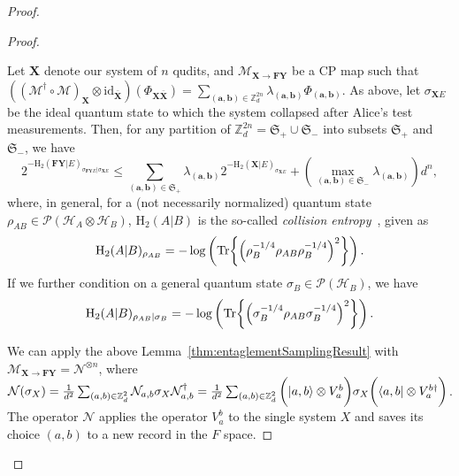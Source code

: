 \begin{proof}
\begin{proof}
\begin{lemma} 
\label{thm:entaglementSamplingResult}
Let $\mathbf{X}$ denote our system of  $n$ qudits, and  $\mathcal{M}_{\mathbf{X}\rightarrow \mathbf{F}\mathbf{Y}}$ be a CP map such that $((\mathcal{M}^\dagger \circ \mathcal{M})_{\mathbf{X}}\otimes \text{id}_{\bar{\mathbf{X}}})(\Phi_{\mathbf{X}\bar{\mathbf{X}}}) = \sum_{(\bm{a},\bm{b})\in\mathbb{Z}^{2n}_d} \lambda_{(\bm{a},\bm{b})} \Phi_{(\bm{a},\bm{b})}$. As above, let $\sigma_{\mathbf{X} E}$ be the ideal quantum state to which the system collapsed after Alice's test measurements.  Then, for any partition of $\mathbb{Z}^{2n}_d = \mathfrak{S}_+ \cup \mathfrak{S}_-$ into subsets $\mathfrak{S}_+$ and $\mathfrak{S}_-$, we have 
\begin{equation}
    2^{-\text{H}_2(\mathbf{F}\mathbf{Y} | E)_{\sigma_{\mathbf{F}\mathbf{Y}E} | \sigma_{\mathbf{X}E}}} \leq \sum_{(\bm{a},\bm{b})\in\mathfrak{S}_+} \lambda_{(\bm{a},\bm{b})} 2^{-\text{H}_2(\mathbf{X} | E)_{\sigma_{\mathbf{X}E}}} + (\max_{(\bm{a},\bm{b})\in\mathfrak{S}_-} \lambda_{(\bm{a},\bm{b})}) d^n,
\end{equation}
 where, in general, for a (not necessarily normalized) quantum state $\rho_{AB}\in \mathcal{P}(\mathcal{H}_A\otimes\mathcal{H}_B)$, $\text{H}_2(A|B)$   is the so-called \textit{collision entropy}~\cite{R06}, given as 
\begin{equation*} 
    \text{H}_2(A|B)_{\rho_{AB}}=-\log \left(\Tr{\left(\rho_{B}^{-1/4}\rho_{AB}\rho_B^{-1/4}\right)^2}\right).
\end{equation*}
If we further condition on a general quantum state $\sigma_B\in\mathcal{P}(\mathcal{H}_B)$, we have 
\begin{equation*}
    \text{H}_2(A|B)_{\rho_{AB}|\sigma_B}=-\log \left(\Tr{\left(\sigma_{B}^{-1/4}\rho_{AB}\sigma_B^{-1/4}\right)^2}\right).
\end{equation*}
\end{lemma}
We can apply the above Lemma~\ref{thm:entaglementSamplingResult}  with $\mathcal{M}_{\mathbf{X}\rightarrow \mathbf{F}\mathbf{Y}} = \mathcal{N}^{\otimes n}$, where $\mathcal{N}(\sigma_X) = \frac{1}{d^2}\sum_{(a,b)\in\mathbb{Z}^2_d}\mathcal{N}_{a,b} \sigma_X \mathcal{N}_{a,b}^\dagger = \frac{1}{d^2} \sum_{(a,b)\in\mathbb{Z}^2_d} \bigg( | a,b \rangle \otimes V^b_a \bigg) \sigma_X \bigg( \langle a,b | \otimes V^{b\dagger}_a \bigg) $. The operator $\mathcal{N}$ applies the operator $V^b_a$ to the single system $X$ and saves its choice $(a,b)$ to a new record in the  $F$ space.  


\end{proof}
\end{proof}

